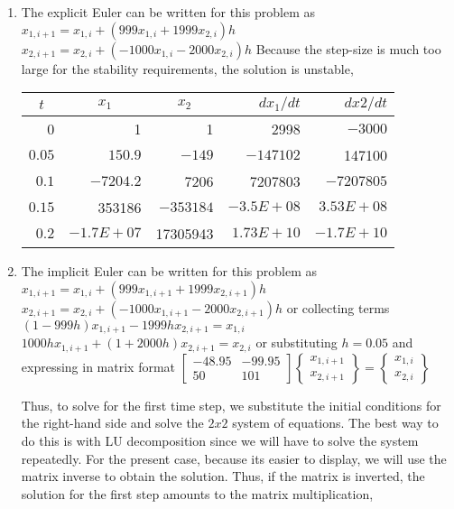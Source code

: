 \documentclass[../main.tex]{subfiles}
\begin{document}
\section{}
\begin{enumerate}[label=\bfseries(\alph*)]
\item The explicit Euler can be written for this problem as
	\bigbreak
$x_{1, i+1}=x_{1, i}+\left(999 x_{1, i}+1999 x_{2, i}\right) h$
	\bigbreak
$x_{2, i+1}=x_{2, i}+\left(-1000 x_{1, i}-2000 x_{2, i}\right) h$
	\bigbreak
Because the step-size is much too large for the stability requirements, the solution is unstable,
	\bigbreak
\begin{tabular}{rrrrr}
\hline
\multicolumn{1}{c}{$t$} & \multicolumn{1}{c}{$x_{1}$} & \multicolumn{1}{c}{$x_{2}$} & $d x_{1} / d t$ & $d x 2 / d t$ \\
\hline
0 & 1 & 1 & 2998 & $-3000$ \\
$0.05$ & $150.9$ & $-149$ & $-147102$ & 147100 \\
$0.1$ & $-7204.2$ & 7206 & 7207803 & $-7207805$ \\
$0.15$ & 353186 & $-353184$ & $-3.5 E+08$ & $3.53 E+08$ \\
$0.2$ & $-1.7 E+07$ & 17305943 & $1.73 E+10$ & $-1.7 E+10$ \\
\hline
\end{tabular}
	\bigbreak
\item The implicit Euler can be written for this problem as
	\bigbreak
$x_{1, i+1}=x_{1, i}+\left(999 x_{1, i+1}+1999 x_{2, i+1}\right) h$
	\bigbreak
$x_{2, i+1}=x_{2, i}+\left(-1000 x_{1, i+1}-2000 x_{2, i+1}\right) h$
	\bigbreak
or collecting terms
	\bigbreak
$(1-999 h) x_{1, i+1}-1999 h x_{2, i+1}=x_{1, i}$
	\bigbreak
$1000 h x_{1, i+1}+(1+2000 h) x_{2, i+1}=x_{2, i}$
	\bigbreak
or substituting $h=0.05$ and expressing in matrix format
	\bigbreak
$
\left[\begin{array}{cc}
-48.95 & -99.95 \\
50 & 101
\end{array}\right]\left\{\begin{array}{l}
x_{1, i+1} \\
x_{2, i+1}
\end{array}\right\}=\left\{\begin{array}{l}
x_{1, i} \\
x_{2, i}
\end{array}\right\}
$
	\bigbreak
\begin{blockquote}
Thus, to solve for the first time step, we substitute the initial conditions for the right-hand side and solve the $2 x 2$ system of equations. The best way to do this is with LU decomposition since we will have to solve the system repeatedly. For the present case, because its easier to display, we will use the matrix inverse to obtain the solution. Thus, if the matrix is inverted, the solution for the first step amounts to the matrix multiplication,

\end{blockquote}
\end{enumerate}
\end{document}

